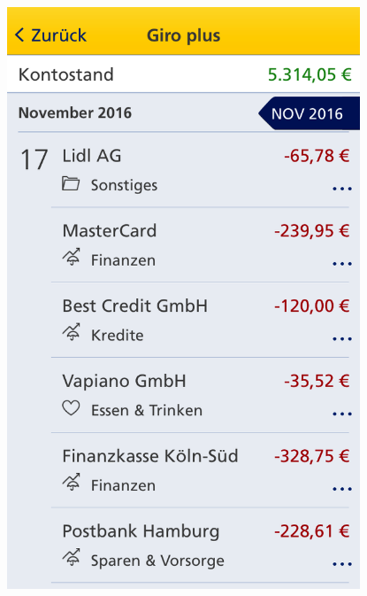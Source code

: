 \begin{figure}[H] 
    \begin{minipage}[b]{.5\linewidth}
        \centering\includegraphics[width=0.94\textwidth]{img/screenshots/ex3p3.png}
    \end{minipage}%
    \begin{minipage}[b]{.5\linewidth}

\end{minipage}
\end{figure}
